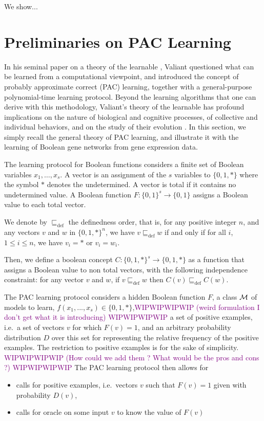 \documentclass{llncs}
\newcommand{\wip}[1]{\textcolor{Purple}{WIPWIPWIPWIP #1 WIPWIPWIPWIP}}
\newcommand{\defleq}{\sqsubseteq_{\text{def}}}
\begin{document}
We show...

\section{Preliminaries on PAC Learning}\label{pac}

In his seminal paper on a theory of the learnable \cite{Valiant84cacm},
Valiant questioned what can be learned from a computational viewpoint,
and introduced the concept of probably approximate correct (PAC) learning,
together with a general-purpose polynomial-time learning protocol.
Beyond the learning algorithms that one can derive with this methodology,
Valiant's theory of the learnable has profound implications
on the nature of biological and cognitive processes,
of collective and individual behaviors,
and on the study of their evolution \cite{Valiant13book}.
In this section, we simply recall the general theory of PAC learning,
and illustrate it with the learning of Boolean gene networks from gene expression data.

The learning protocol for Boolean functions considers
a finite set of Boolean variables $x_1,\ldots,x_s$.
A vector is an assignment of the $s$ variables to $\{0,1,*\}$
where the symbol $*$ denotes the undetermined.
A vector is total if it contains no undetermined value.
A Boolean function $F:\{0,1\}^s \rightarrow\{0,1\}$
assigns a Boolean value to each total vector.

We denote by $\defleq$ the definedness order, that is, for any positive integer $n$, and any vectors $v$ and $w$ in $\{0,1,*\}^n$, we have $v \defleq w$ if and only if for all $i$, $1 \leq i \leq n$, we have $v_i = *$ or $v_i = w_i$.

Then, we define a boolean concept $C:\{0,1,*\}^s \rightarrow\{0,1,*\}$ as a function that
assigns a Boolean value to non total vectors,
with the following independence constraint:
for any vector $v$ and $w$, if $v \defleq w$ then $C(v) \defleq C(w)$.

The PAC learning protocol considers a hidden Boolean function $F$,
a class $\cal M$ of models to learn, $f(x_1,...,x_s) \in \{0,1,*\}$,\wip{(weird formulation I don't get what it is introducing)}
a set of positive examples, i.e.~a set of vectors $v$ for which $F(v)=1$,
and an arbitrary probability distribution $D$ over this set
for representing the relative frequency of the positive examples.
The restriction to positive examples is for the sake of simplicity.
\wip{(How could we add them ? What would be the pros and cons ?)}
The PAC learning protocol then allows for
\begin{itemize}
  \item
calls for positive examples, i.e.~vectors $v$ such that $F(v)=1$ given with probability $D(v)$,
  \item
calls for oracle on some input $v$ to know the value of $F(v)$
\end{itemize}
\end{document}
